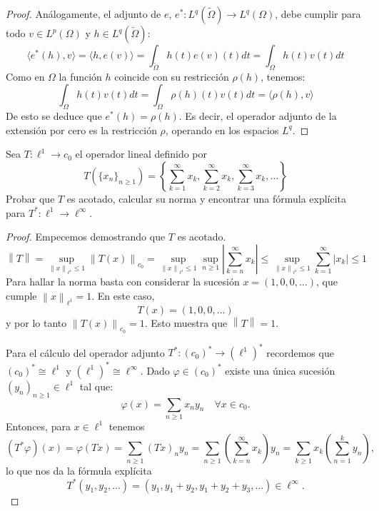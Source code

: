 \documentclass{article}
\theoremstyle{definition}
\newcommand{\norm}[1]{\left\lVert #1 \right\rVert}       %
\newenvironment{ejercicio}[1]{\begin{trivlist}
\item[\hskip \labelsep {\bfseries Ejercicio}\hskip \labelsep {\bfseries #1.}]}{\end{trivlist}}
\begin{document}
\begin{proof}
	Análogamente, el adjunto de \( e \), \( e^* : L^q(\tilde{\Omega}) \to L^q(\Omega) \), debe cumplir para todo \( v \in L^p(\Omega) \) y \( h \in L^q(\tilde{\Omega}) \):
	\[ \langle e^*(h), v \rangle = \langle h, e(v) \rangle = \int_{\tilde{\Omega}} h(t) e(v)(t) dt = \int_{\Omega} h(t) v(t) dt \]
	Como en \( \Omega \) la función \( h \) coincide con su restricción \( \rho(h) \), tenemos:
	\[ \int_{\Omega} h(t) v(t) dt = \int_{\Omega} \rho(h)(t) v(t) dt = \langle \rho(h), v \rangle \]
	De esto se deduce que \( e^*(h) = \rho(h) \). Es decir, el operador adjunto de la extensión por cero es la restricción \( \rho \), operando en los espacios \( L^q \).
\end{proof}

\vspace{0.5cm}

\begin{ejercicio}{4}
	Sea \( T:\ell^{1}\rightarrow c_{0} \) el operador lineal definido por
	\[ T({\{x_{n}\}}_{n\ge 1}) = {\left \{ \sum_{k=1}^{\infty}x_{k}, \sum_{k=2}^{\infty}x_{k}, \sum_{k=3}^{\infty}x_{k}, \dots \right \}} \]
	Probar que \( T \) es acotado, calcular su norma y encontrar una fórmula explícita para \( T^{*}:\ell^{1}\rightarrow \ell^{\infty} \).
\end{ejercicio}
\begin{proof}
	Empecemos demostrando que \( T \) es acotado. \[
		\norm{T} = \sup_{\norm{x}_{\ell^1} \le 1} \norm{T(x)}_{c_0} = \sup_{\norm{x}_{\ell^1} \le 1} \sup_{n \ge 1} \left| \sum_{k=n}^{\infty} x_k \right| \le \sup_{\norm{x}_{\ell^1} \le 1} \sum_{k=1}^{\infty} |x_k| \le 1
	\]
	Para hallar la norma basta con considerar la sucesión \( x = (1,0,0,\dots) \), que cumple \( \norm{x}_{\ell^1} = 1 \). En este caso,
	\[ T(x) = (1,0,0,\dots) \]
	y por lo tanto \( \norm{T(x)}_{c_0} = 1 \). Esto muestra que \( \norm{T} = 1 \).

	Para el cálculo del operador adjunto \( T^* : {(c_0)}^* \to {(\ell^1)}^* \) recordemos que \({(c_0)}^* \cong \ell^1\) y \({(\ell^1)}^* \cong \ell^\infty \). Dado \( \varphi \in {(c_0)}^* \) existe una única sucesión \( {(y_n)}_{n \ge 1} \in \ell^1 \) tal que:\[
		\varphi(x) = \sum_{n\ge1} x_n y_n \quad \forall x \in c_0.
	\]
	Entonces, para \( x \in \ell^1 \) tenemos
	\[
		(T^*\varphi)(x) = \varphi(Tx) = \sum_{n\ge1} (Tx)_n y_n = \sum_{n\ge1} \left( \sum_{k=n}^{\infty} x_k \right) y_n = \sum_{k\ge1} x_k \left( \sum_{n=1}^{k} y_n \right),
	\]
	lo que nos da la fórmula explícita
	\[
		T^*(y_1, y_2, \dots) = \left( y_1, y_1+y_2, y_1+y_2+y_3, \dots \right) \in \ell^\infty.
	\]
\end{proof}
\end{document}
